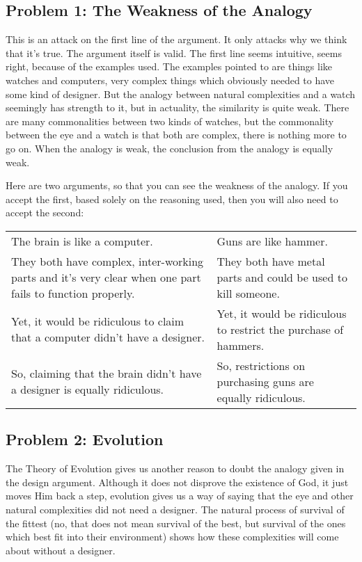 \subsection{Problem 1: The Weakness of the Analogy}

This is an attack on the first line of the argument. It only attacks why we think that it’s true. The argument itself is valid. The first line seems intuitive, seems right, because of the examples used. The examples pointed to are things like watches and computers, very complex things which obviously needed to have some kind of designer. But the analogy between natural complexities and a watch seemingly has strength to it, but in actuality, the similarity is quite weak. There are many commonalities between two kinds of watches, but the commonality between the eye and a watch is that both are complex, there is nothing more to go on. When the analogy is weak, the conclusion from the analogy is equally weak.

Here are two arguments, so that you can see the weakness of the analogy. If you accept the first, based solely on the reasoning used, then you will also need to accept the second:
\begin{tabular}{p{1.75in}|p{1.75in}}
    The brain is like a computer.&Guns are like hammer.\\
    They both have complex, inter-working parts and it’s very clear when one part fails to function properly.&They both have metal parts and could be used to kill someone.\\
    Yet, it would be ridiculous to claim that a computer didn’t have a designer.&Yet, it would be ridiculous to restrict the purchase of hammers.\\
    So, claiming that the brain didn’t have a designer is equally ridiculous.&So, restrictions on purchasing guns are equally ridiculous.
\end{tabular}

\subsection{Problem 2: Evolution}

The Theory of Evolution gives us another reason to doubt the analogy given in the design argument. Although it does not disprove the existence of God, it just moves Him back a step, evolution gives us a way of saying that the eye and other natural complexities did not need a designer. The natural process of survival of the fittest (no, that does not mean survival of the best, but survival of the ones which best fit into their environment) shows how these complexities will come about without a designer.

